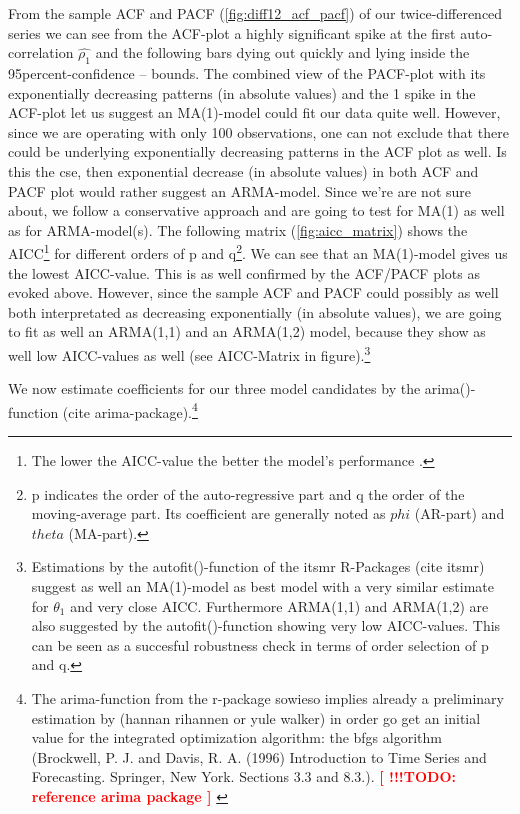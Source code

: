 \documentclass[11pt,a4paper]{article}
\newcommand{\TODO}[1]{%
    \textcolor{red}{ %
        \textbf{[ !!!TODO: #1 ]}%
    }%
    \PackageWarning{TODO:}{TODO: #1}%
}
\begin{document}
From the sample ACF and PACF (\cref{fig:diff12_acf_pacf}) of our twice-differenced series we can see from the ACF-plot a highly significant spike at the first auto-correlation $\hat{\rho_1}$ and the following bars dying out quickly and lying inside the 95percent-confidence – bounds.
The combined view of the PACF-plot with its exponentially decreasing patterns (in absolute values) and the 1 spike in the ACF-plot let us suggest an MA(1)-model could fit our data quite well.
However, since we are operating with only 100 observations, one can not exclude that there could be underlying exponentially decreasing patterns in the ACF plot as well.
Is this the cse, then exponential decrease (in absolute values) in both ACF and PACF plot would rather suggest an ARMA-model.
Since  we’re are not sure about, we follow a conservative approach and are going to test for MA(1) as well as for ARMA-model(s).
The following matrix (\cref{fig:aicc_matrix}) shows the AICC\footnote{
    The lower the AICC-value the better the model's performance \citep{aic86}.
}
for different orders of p and q\footnote{
    p indicates the order of the auto-regressive part and q the order of the moving-average part.
    Its coefficient are generally noted as $phi$ (AR-part) and $theta$ (MA-part).
}.
We can see that an MA(1)-model gives us the lowest AICC-value.
This is as well confirmed by the ACF/PACF plots as evoked above.
However, since the sample ACF and PACF could possibly as well both interpretated as decreasing exponentially (in absolute values), we are going to fit as well an ARMA(1,1) and an ARMA(1,2) model, because they show as well low AICC-values as well (see AICC-Matrix in figure).\footnote{
    Estimations by the autofit()-function of the itsmr R-Packages (cite itsmr) suggest as well an MA(1)-model as best model with a very similar estimate for $\theta_1$ and very close AICC.
    Furthermore ARMA(1,1) and ARMA(1,2) are also suggested by the autofit()-function showing very low AICC-values.
    This can be seen as a succesful robustness check in terms of order selection of p and q.
}

We now estimate coefficients for our three model candidates by the arima()-function (cite arima-package).\footnote{
    The arima-function from the r-package sowieso implies already a preliminary estimation by (hannan rihannen or yule walker) in order go get an initial value for the integrated optimization algorithm:
    the bfgs algorithm (Brockwell, P. J. and Davis, R. A. (1996) Introduction to Time Series and Forecasting. Springer, New York. Sections 3.3 and 8.3.).
    \TODO{reference arima package}
}
\end{document}
